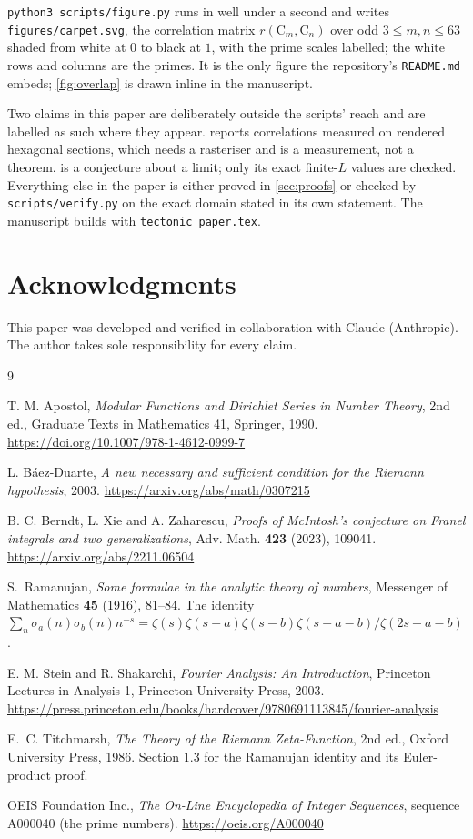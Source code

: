 \documentclass[11pt]{amsart}
\theoremstyle{definition}
\theoremstyle{remark}
\begin{document}
\texttt{python3 scripts/figure.py} runs in well under a second and writes \texttt{figures/carpet.svg}, the correlation matrix $r(\mathrm{C}_m,\mathrm{C}_n)$ over odd $3\le m,n\le63$ shaded from white at $0$ to black at $1$, with the prime scales labelled; the white rows and columns are the primes. It is the only figure the repository's \texttt{README.md} embeds; \cref{fig:overlap} is drawn inline in the manuscript.

Two claims in this paper are deliberately outside the scripts' reach and are labelled as such where they appear.  reports correlations measured on rendered hexagonal sections, which needs a rasteriser and is a measurement, not a theorem.  is a conjecture about a limit; only its exact finite-$L$ values are checked. Everything else in the paper is either proved in \cref{sec:proofs} or checked by \texttt{scripts/verify.py} on the exact domain stated in its own statement. The manuscript builds with \texttt{tectonic paper.tex}.

\section*{Acknowledgments}

This paper was developed and verified in collaboration with Claude (Anthropic). The author takes sole responsibility for every claim.

\begin{thebibliography}{9}

T. M. Apostol, \emph{Modular Functions and Dirichlet Series in Number Theory}, 2nd ed., Graduate Texts in Mathematics 41, Springer, 1990. \url{https://doi.org/10.1007/978-1-4612-0999-7}

L. B\'aez-Duarte, \emph{A new necessary and sufficient condition for the Riemann hypothesis}, 2003. \url{https://arxiv.org/abs/math/0307215}

B. C. Berndt, L. Xie and A. Zaharescu, \emph{Proofs of McIntosh's conjecture on Franel integrals and two generalizations}, Adv. Math. \textbf{423} (2023), 109041. \url{https://arxiv.org/abs/2211.06504}

S.~Ramanujan, \emph{Some formulae in the analytic theory of numbers}, Messenger of Mathematics \textbf{45} (1916), 81--84. The identity $\sum_n \sigma_a(n)\sigma_b(n) n^{-s} = \zeta(s)\zeta(s-a)\zeta(s-b)\zeta(s-a-b)/\zeta(2s-a-b)$.

E. M. Stein and R. Shakarchi, \emph{Fourier Analysis: An Introduction}, Princeton Lectures in Analysis 1, Princeton University Press, 2003. \url{https://press.princeton.edu/books/hardcover/9780691113845/fourier-analysis}

E.~C. Titchmarsh, \emph{The Theory of the Riemann Zeta-Function}, 2nd ed., Oxford University Press, 1986. Section 1.3 for the Ramanujan identity and its Euler-product proof.

OEIS Foundation Inc., \emph{The On-Line Encyclopedia of Integer Sequences}, sequence A000040 (the prime numbers). \url{https://oeis.org/A000040}

\end{thebibliography}
\end{document}
